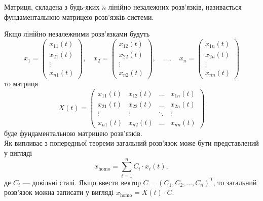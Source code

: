 \begin{definition}
	Матриця, складена з будь-яких $n$ лінійно незалежних роз\-в'яз\-ків, називається фундаментальною матрицею розв'язків системи.
\end{definition}

Якщо лінійно незалежними розв'язками будуть \[ x_1 = \begin{pmatrix} x_{11}(t) \\ x_{21}(t) \\ \vdots \\ x_{n1}(t) \end{pmatrix}, \quad x_2 = \begin{pmatrix} x_{12}(t) \\ x_{22}(t) \\ \vdots \\ x_{n2}(t) \end{pmatrix}, \quad \ldots, \quad x_n = \begin{pmatrix} x_{1n}(t) \\ x_{2n}(t) \\ \vdots \\ x_{nn}(t) \end{pmatrix} \] то матриця
\begin{equation*}
	X(t) = \begin{pmatrix} x_{11} (t) & x_{12} (t) & \ldots & x_{1n} (t) \\ x_{21} (t) & x_{22} (t) & \ldots & x_{2n} (t) \\ \vdots & \vdots & \ddots & \vdots \\ x_{n1} (t) & x_{n2} (t) & \ldots & x_{nn} (t) \end{pmatrix}
\end{equation*}
буде фундаментальною матрицею розв'язків. \\

Як випливає з попередньої теореми загальний розв'язок може бути представлений у вигляді
\begin{equation*}
	x_{\text{homo}} = \sum_{i = 1}^n C_i \cdot x_i(t),
\end{equation*}
де $C_i$ --- довільні сталі. Якщо ввести вектор $C = (C_1, C_2, \ldots, C_n)^T$, то загальний розв'язок можна записати у вигляді $x_{\text{homo}} = X(t) \cdot C$.
